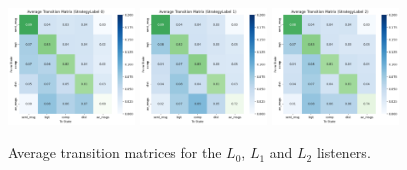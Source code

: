 \begin{figure}
    \centering
    \includegraphics[width=0.3\textwidth]{images/trans_mat_l0.png}
    \includegraphics[width=0.3\textwidth]{images/trans_mat_l1.png}
    \includegraphics[width=0.3\textwidth]{images/trans_mat_l2.png}
    \caption{Average transition matrices for the $L_0$, $L_1$ and $L_2$ listeners.}
    \label{fig:trans_mat}
\end{figure}



